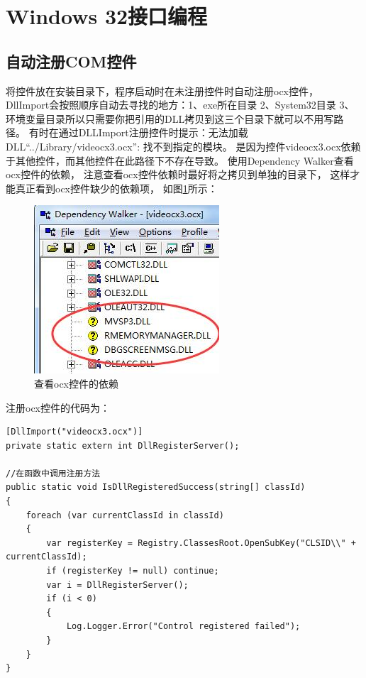 \documentclass{book}
\begin{document}
\section{Windows 32接口编程}

\subsection{自动注册COM控件}

将控件放在安装目录下，程序启动时在未注册控件时自动注册ocx控件，
DllImport会按照顺序自动去寻找的地方：1、exe所在目录 2、System32目录 3、环境变量目录所以只需要你把引用的DLL拷贝到这三个目录下就可以不用写路径。
有时在通过DLLImport注册控件时提示：无法加载 DLL“../Library/videocx3.ocx”: 找不到指定的模块。
是因为控件videocx3.ocx依赖于其他控件，而其他控件在此路径下不存在导致。
使用Dependency Walker查看ocx控件的依赖，
注意查看ocx控件依赖时最好将之拷贝到单独的目录下，
这样才能真正看到ocx控件缺少的依赖项，
如图\ref{fig:VideoControllerDependency}所示：

\begin{figure}[htbp]
	\centering
	\includegraphics[scale=0.6]{VideoControllerDependency.jpg}
	\caption{查看ocx控件的依赖}
	\label{fig:VideoControllerDependency}
\end{figure}

注册ocx控件的代码为：

\begin{lstlisting}[language={[Sharp]C}]
[DllImport("videocx3.ocx")]
private static extern int DllRegisterServer();

//在函数中调用注册方法
public static void IsDllRegisteredSuccess(string[] classId)
{
	foreach (var currentClassId in classId)
	{
		var registerKey = Registry.ClassesRoot.OpenSubKey("CLSID\\" + currentClassId);
		if (registerKey != null) continue;
		var i = DllRegisterServer();
		if (i < 0)
		{
			Log.Logger.Error("Control registered failed");
		}
	}
}
\end{lstlisting}
\end{document}
